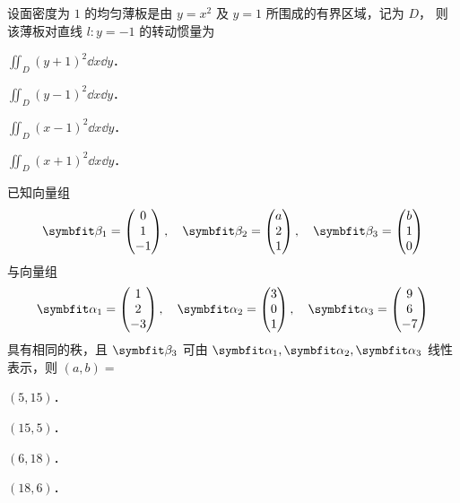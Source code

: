 \begin{question}[index=4]
设面密度为 $1$ 的均匀薄板是由 $y=x^2$ 及 $y=1$ 所围成的有界区域，记为 $D$，
则该薄板对直线 $l:y=-1$ 的转动惯量为
\begin{choices}[columns=2,label-pos=left]
\item $\displaystyle\iint_D(y+1)^2\dd x\dd y$．
\item $\displaystyle\iint_D(y-1)^2\dd x\dd y$．
\item $\displaystyle\iint_D(x-1)^2\dd x\dd y$．
\item $\displaystyle\iint_D(x+1)^2\dd x\dd y$．
\end{choices}
\end{question}
\QuestionBreak

\begin{question}[index=5]
已知向量组
\[
\symbfit\beta_1=\begin{pmatrix}0\\1\\-1\end{pmatrix},\quad
\symbfit\beta_2=\begin{pmatrix}a\\2\\1\end{pmatrix},\quad
\symbfit\beta_3=\begin{pmatrix}b\\1\\0\end{pmatrix}
\]
与向量组
\[
\symbfit\alpha_1=\begin{pmatrix}1\\2\\-3\end{pmatrix},\quad
\symbfit\alpha_2=\begin{pmatrix}3\\0\\1\end{pmatrix},\quad
\symbfit\alpha_3=\begin{pmatrix}9\\6\\-7\end{pmatrix}
\]
具有相同的秩，且 $\symbfit\beta_3$ 可由 $\symbfit\alpha_1,\symbfit\alpha_2,\symbfit\alpha_3$
线性表示，则 $(a,b)=$
\begin{choices}[columns=4]
\item $(5,15)$．
\item $(15,5)$．
\item $(6,18)$．
\item $(18,6)$．
\end{choices}
\end{question}
\QuestionBreak

